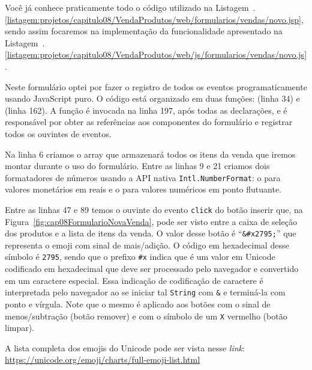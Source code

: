 Você já conhece praticamente todo o código utilizado na Listagem~\thechapter.\ref{listagem:projetos/capitulo08/VendaProdutos/web/formularios/vendas/novo.jsp}, sendo assim focaremos na implementação da funcionalidade apresentado na Listagem~\thechapter.\ref{listagem:projetos/capitulo08/VendaProdutos/web/js/formularios/vendas/novo.js}.


Neste formulário optei por fazer o registro de todos os eventos programaticamente usando JavaScript puro. O código está organizado em duas funções:  (linha 34) e  (linha 162). A função  é invocada na linha 197, após todas as declarações, e é responsável por obter as referências aos componentes do formulário e registrar todos os ouvintes de eventos.

Na linha 6 criamos o array  que armazenará todos os itens da venda que iremos montar durante o uso do formulário. Entre as linhas 9 e 21 criamos dois formatadores de números usando a API nativa \texttt{Intl.NumberFormat}: o  para valores monetários em reais e o  para valores numéricos em ponto flutuante.

Entre as linhas 47 e 89 temos o ouvinte do evento \texttt{click} do botão inserir que, na Figura~\ref{fig:cap08FormularioNovaVenda}, pode ser visto entre a caixa de seleção dos produtos e a lista de itens da venda. O valor desse botão é ``\texttt{\&\#x2795;}'' que representa o emoji com sinal de mais/adição. O código em hexadecimal desse símbolo é \texttt{2795}, sendo que o prefixo \texttt{\#x} indica que é um valor em Unicode codificado em hexadecimal que deve ser processado pelo navegador e convertido em um caractere especial. Essa indicação de codificação de caractere é interpretada pelo navegador ao se iniciar tal \texttt{String} com \texttt{\&} e terminá-la com ponto e vírgula. Note que o mesmo é aplicado aos botões com o sinal de menos/subtração (botão remover) e com o símbolo de um \texttt{X} vermelho (botão limpar).

\begin{saibaMais}
    A lista completa dos emojis do Unicode pode ser vista nesse \textit{link}: \url{https://unicode.org/emoji/charts/full-emoji-list.html}
\end{saibaMais}


